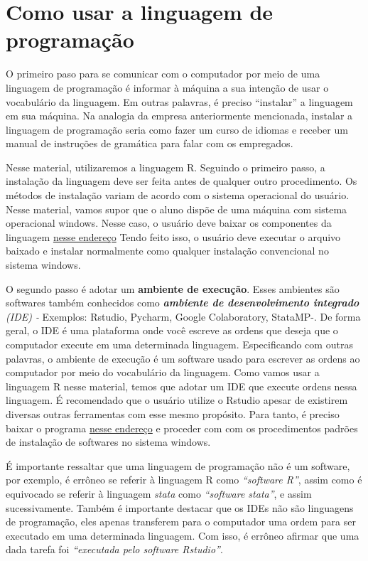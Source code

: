 \documentclass[
  letterpaper,
  DIV=11,
  numbers=noendperiod]{scrreprt}
\begin{document}
\section{Como usar a linguagem de
programação}\label{como-usar-a-linguagem-de-programauxe7uxe3o}

O primeiro paso para se comunicar com o computador por meio de uma
linguagem de programação é informar à máquina a sua intenção de usar o
vocabulário da linguagem. Em outras palavras, é preciso ``instalar'' a
linguagem em sua máquina. Na analogia da empresa anteriormente
mencionada, instalar a linguagem de programação seria como fazer um
curso de idiomas e receber um manual de instruções de gramática para
falar com os empregados.

Nesse material, utilizaremos a linguagem R. Seguindo o primeiro passo, a
instalação da linguagem deve ser feita antes de qualquer outro
procedimento. Os métodos de instalação variam de acordo com o sistema
operacional do usuário. Nesse material, vamos supor que o aluno dispõe
de uma máquina com sistema operacional windows. Nesse caso, o usuário
deve baixar os componentes da linguagem
\href{https://cran.r-project.org/bin/windows/base/}{nesse endereço}
Tendo feito isso, o usuário deve executar o arquivo baixado e instalar
normalmente como qualquer instalação convencional no sistema windows.

O segundo passo é adotar um \textbf{ambiente de execução}. Esses
ambientes são softwares também conhecidos como \emph{\textbf{ambiente de
desenvolvimento integrado} (IDE) -} Exemplos: Rstudio, Pycharm, Google
Colaboratory, StataMP-. De forma geral, o IDE é uma plataforma onde você
escreve as ordens que deseja que o computador execute em uma determinada
linguagem. Especificando com outras palavras, o ambiente de execução é
um software usado para escrever as ordens ao computador por meio do
vocabulário da linguagem. Como vamos usar a linguagem R nesse material,
temos que adotar um IDE que execute ordens nessa linguagem. É
recomendado que o usuário utilize o Rstudio apesar de existirem diversas
outras ferramentas com esse mesmo propósito. Para tanto, é preciso
baixar o programa
\href{https://posit.co/download/rstudio-desktop/?cmplz-force-reload=1751898658132}{nesse
endereço} e proceder com com os procedimentos padrões de instalação de
softwares no sistema windows.

É importante ressaltar que uma linguagem de programação não é um
software, por exemplo, é errôneo se referir à linguagem R como
\emph{``software R''}, assim como é equivocado se referir à linguagem
\emph{stata} como \emph{``software stata''}, e assim sucessivamente.
Também é importante destacar que os IDEs não são linguagens de
programação, eles apenas transferem para o computador uma ordem para ser
executado em uma determinada linguagem. Com isso, é errôneo afirmar que
uma dada tarefa foi \emph{``executada pelo software Rstudio''}.
\end{document}
